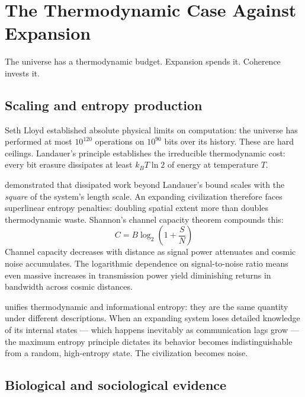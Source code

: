 \documentclass[12pt, a4paper]{article}
\begin{document}
\section{The Thermodynamic Case Against Expansion}

\begin{pullquote}
The universe has a thermodynamic budget. Expansion spends it. Coherence invests it.
\end{pullquote}

\subsection{Scaling and entropy production}

Seth Lloyd \citep{lloyd2000} established absolute physical limits on computation: the
universe has performed at most $10^{120}$ operations on $10^{90}$ bits over its history.
These are hard ceilings. Landauer's principle \citep{landauer1961} establishes the
irreducible thermodynamic cost: every bit erasure dissipates at least $k_B T \ln 2$ of
energy at temperature $T$.

\citet{boyd2022} demonstrated that dissipated work beyond Landauer's bound scales with the
\textit{square} of the system's length scale. An expanding civilization therefore faces
superlinear entropy penalties: doubling spatial extent more than doubles thermodynamic waste.
Shannon's channel capacity theorem \citep{shannon1948} compounds this:
\[
C = B \log_2\!\left(1 + \frac{S}{N}\right)
\]
Channel capacity decreases with distance as signal power attenuates and cosmic noise
accumulates. The logarithmic dependence on signal-to-noise ratio means even massive
increases in transmission power yield diminishing returns in bandwidth across cosmic
distances.

\citet{jaynes1957} unifies thermodynamic and informational entropy: they are the same
quantity under different descriptions. When an expanding system loses detailed knowledge of
its internal states --- which happens inevitably as communication lags grow --- the maximum
entropy principle dictates its behavior becomes indistinguishable from a random, high-entropy
state. The civilization becomes noise.

\subsection{Biological and sociological evidence}
\end{document}
